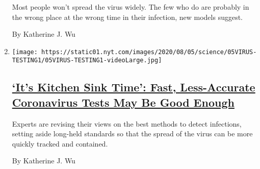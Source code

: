 \begin{enumerate}
  Most people won't spread the virus widely. The few who do are probably
  in the wrong place at the wrong time in their infection, new models
  suggest.

  By Katherine J. Wu
\item
  \texttt{[image: https://static01.nyt.com/images/2020/08/05/science/05VIRUS-TESTING1/05VIRUS-TESTING1-videoLarge.jpg]}

  \hypertarget{its-kitchen-sink-time-fast-less-accurate-coronavirus-tests-may-be-good-enough}{%
  \subsection{\texorpdfstring{\href{/2020/08/06/health/rapid-Covid-tests.html}{`It's
  Kitchen Sink Time': Fast, Less-Accurate Coronavirus Tests May Be Good
  Enough}}{`It's Kitchen Sink Time': Fast, Less-Accurate Coronavirus Tests May Be Good Enough}}\label{its-kitchen-sink-time-fast-less-accurate-coronavirus-tests-may-be-good-enough}}

  Experts are revising their views on the best methods to detect
  infections, setting aside long-held standards so that the spread of
  the virus can be more quickly tracked and contained.

  By Katherine J. Wu
\end{enumerate}

